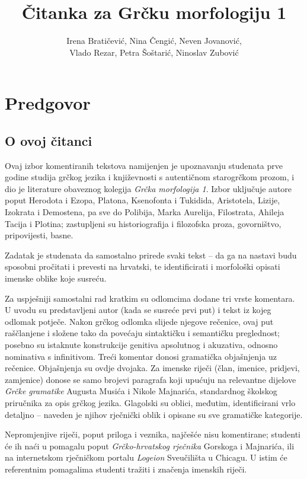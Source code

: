 \documentclass[a4paper,12pt,twoside]{report}
\begin{document}
\title{Čitanka za Grčku morfologiju 1}
\author{Irena Bratičević, Nina Čengić, Neven Jovanović,\\Vlado Rezar, Petra Šoštarić, Ninoslav Zubović}
\date{}


\clearpage
\thispagestyle{empty}




\chapter*{Predgovor}
\label{chap:predgovor}

\section*{O ovoj čitanci}

Ovaj izbor komentiranih tekstova namijenjen je upoznavanju studenata prve godine studija grčkog jezika i književnosti s autentičnom starogrčkom prozom, i dio je literature obaveznog kolegija \textit{Grčka morfologija 1}. Izbor uključuje autore poput Herodota i Ezopa, Platona, Ksenofonta i Tukidida, Aristotela, Lizije, Izokrata i Demostena, pa sve do Polibija, Marka Aurelija, Filostrata, Ahileja Tacija i Plotina; zastupljeni su historiografija i filozofska proza, govorništvo, pripovijesti, basne.

Zadatak je studenata da samostalno prirede svaki tekst – da ga na nastavi budu sposobni pročitati i prevesti na hrvatski, te identificirati i morfološki opisati imenske oblike koje susreću.

Za uspješniji samostalni rad kratkim su odlomcima dodane tri vrste komentara. U uvodu su predstavljeni autor (kada se susreće prvi put) i tekst iz kojeg odlomak potječe. Nakon grčkog odlomka slijede njegove rečenice, ovaj put raščlanjene i složene tako da povećaju sintaktičku i semantičku preglednost; posebno su istaknute konstrukcije genitiva apsolutnog i akuzativa, odnosno nominativa s infinitivom. Treći komentar donosi gramatička objašnjenja uz rečenice. Objašnjenja su ovdje dvojaka. Za imenske riječi (član, imenice, pridjevi, zamjenice) donose se samo brojevi paragrafa koji upućuju na relevantne dijelove \textit{Grčke gramatike} Augusta Musića i Nikole Majnarića, standardnog školskog priručnika za opis grčkog jezika. Glagolski su oblici, međutim, identificirani vrlo detaljno – naveden je njihov rječnički oblik i opisane su sve gramatičke kategorije. 

Nepromjenjive riječi, poput priloga i veznika, najčešće nisu komentirane; studenti će ih naći u pomagalu poput \textit{Grčko-hrvatskog rječnika} Gorskoga i Majnarića, ili na internetskom rječničkom portalu \textit{Logeion} Sveučilišta u Chicagu. U istim će referentnim pomagalima studenti tražiti i značenja imenskih riječi.
\end{document}
